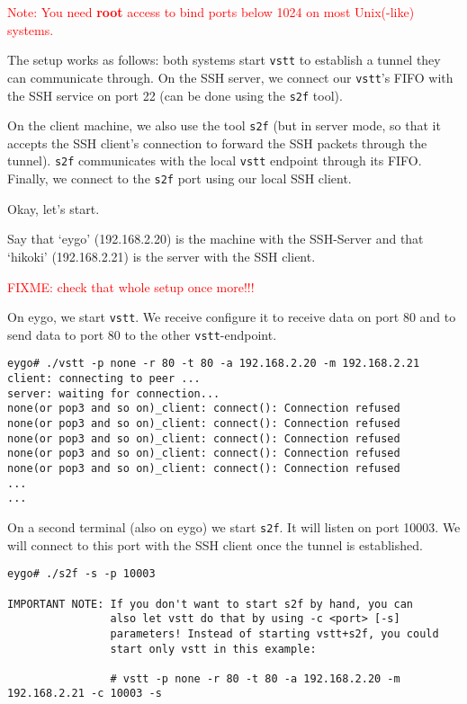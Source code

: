 \documentclass[10pt,a4paper]{article}
\begin{document}
\textcolor{red}{Note: You need \textbf{root} access to bind ports below 1024 on most Unix(-like) systems.}

The setup works as follows: both systems start \texttt{vstt} to establish a tunnel they can communicate through. On the SSH server, we connect our \texttt{vstt}'s FIFO with the SSH service on port 22 (can be done using the \texttt{s2f} tool).

On the client machine, we also use the tool \texttt{s2f} (but in server mode, so that it accepts the SSH client's connection to forward the SSH packets through the tunnel). \texttt{s2f} communicates with the local \texttt{vstt} endpoint through its FIFO. Finally, we connect to the \texttt{s2f} port using our local SSH client.

Okay, let's start.

Say that `eygo' (192.168.2.20) is the machine with the SSH-Server and that `hikoki' (192.168.2.21) is the server with the SSH client.

\textcolor{red}{FIXME: check that whole setup once more!!!}

On eygo, we start \texttt{vstt}. We receive configure it to receive data on port 80 and to send data to port 80 to the other \texttt{vstt}-endpoint.

\begin{verbatim}
eygo# ./vstt -p none -r 80 -t 80 -a 192.168.2.20 -m 192.168.2.21
client: connecting to peer ...
server: waiting for connection...
none(or pop3 and so on)_client: connect(): Connection refused
none(or pop3 and so on)_client: connect(): Connection refused
none(or pop3 and so on)_client: connect(): Connection refused
none(or pop3 and so on)_client: connect(): Connection refused
none(or pop3 and so on)_client: connect(): Connection refused
...
...
\end{verbatim}

On a second terminal (also on eygo) we start \texttt{s2f}. It will listen on port 10003. We will connect to this port with the SSH client once the tunnel is established.

\begin{verbatim}
eygo# ./s2f -s -p 10003

IMPORTANT NOTE: If you don't want to start s2f by hand, you can
                also let vstt do that by using -c <port> [-s]
                parameters! Instead of starting vstt+s2f, you could
                start only vstt in this example:
                
                # vstt -p none -r 80 -t 80 -a 192.168.2.20 -m 192.168.2.21 -c 10003 -s
\end{verbatim}
\end{document}
